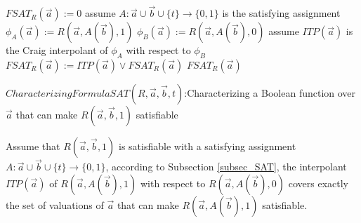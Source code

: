 \documentclass[runningheads,a4paper,orivec]{llncs}
\begin{document}


\begin{algorithm}[t]
\SetAlgoVlined
{}
$FSAT_R(\vec{a}):= 0$ \;
 {
  assume $A:\vec{a}\cup\vec{b}\cup\{t\}\rightarrow \{0,1\}$ is the satisfying assignment \;
  $\phi_A(\vec{a}):= R(\vec{a},A(\vec{b}),1)$ \;
  $\phi_B(\vec{a}):= R(\vec{a},A(\vec{b}),0)$ \;
  assume $ITP(\vec{a})$ is the Craig interpolant of $\phi_A$ with respect to $\phi_B$ \;
  $FSAT_R(\vec{a}):= ITP(\vec{a}) \vee FSAT_R(\vec{a})$ \;
}
\KwRet $FSAT_R(\vec{a})$
\caption{$CharacterizingFormulaSAT(R,\vec{a},\vec{b},t)$:Characterizing a Boolean function over $\vec{a}$ that can make $R(\vec{a},\vec{b},1)$ satisfiable}
\label{alg_craigchar}
\end{algorithm}


Assume that $R(\vec{a},\vec{b},1)$ is satisfiable with a satisfying assignment 
$A:\vec{a}\cup\vec{b}\cup\{t\}\to\{0,1\}$,
according to Subsection \ref{subsec_SAT},
the interpolant $ITP(\vec{a})$ of $R(\vec{a},A(\vec{b}),1)$ with respect to $R(\vec{a},A(\vec{b}),0)$ 
covers exactly the set of valuations of $\vec{a}$ that can make $R(\vec{a},A(\vec{b}),1)$ satisfiable.
\end{document}
